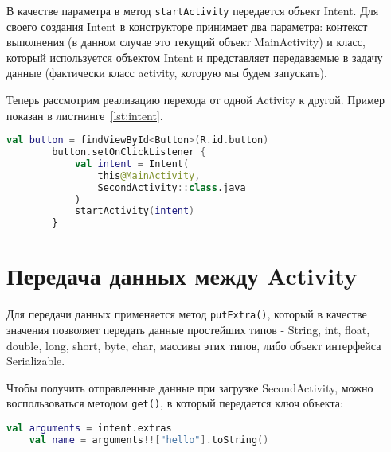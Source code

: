 В качестве параметра в метод \texttt{startActivity} передается объект Intent.
Для своего создания Intent в конструкторе принимает два параметра: контекст
выполнения (в данном случае это текущий объект MainActivity) и класс,
который используется объектом Intent и представляет передаваемые в задачу
данные (фактически класс activity, которую мы будем запускать).\par
Теперь рассмотрим реализацию перехода от одной Activity к другой.
Пример показан в листнинге~\ref{lst:intent}.
\begin{lstlisting}[language=Kotlin, caption=\leftline{}, label=lst:intent]
val button = findViewById<Button>(R.id.button)
        button.setOnClickListener {
            val intent = Intent(
                this@MainActivity,
                SecondActivity::class.java
            )
            startActivity(intent)
        }
\end{lstlisting}

\section{Передача данных между Activity}
Для передачи данных применяется метод \texttt{putExtra()}, который в качестве
значения позволяет передать данные простейших типов - String, int, float,
double, long, short, byte, char, массивы этих типов, либо объект интерфейса
Serializable.\par
Чтобы получить отправленные данные при загрузке SecondActivity, можно
воспользоваться методом \texttt{get()}, в который передается ключ объекта:
\begin{lstlisting}[language=Kotlin, caption=\leftline{Получение намеренья}, label=lst:extras]
	val arguments = intent.extras
	val name = arguments!!["hello"].toString()
\end{lstlisting}

